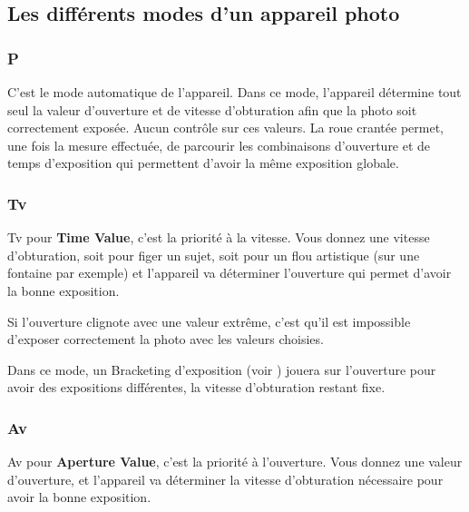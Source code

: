 \documentclass[a4paper,twoside]{article}
\begin{document}

\subsection{Les différents modes d'un appareil photo}
\subsubsection{P}
C'est le mode automatique de l'appareil. Dans ce mode, l'appareil détermine tout seul la valeur d'ouverture et de vitesse d'obturation afin que la photo soit correctement exposée. Aucun contrôle sur ces valeurs. La roue crantée permet, une fois la mesure effectuée, de parcourir les combinaisons d'ouverture et de temps d'exposition qui permettent d'avoir la même exposition globale. 

\subsubsection{Tv}
Tv pour \textbf{Time Value}, c'est la priorité à la vitesse. Vous donnez une vitesse d'obturation, soit pour figer un sujet, soit pour un flou artistique (sur une fontaine par exemple) et l'appareil va déterminer l'ouverture qui permet d'avoir la bonne exposition.

Si l'ouverture clignote avec une valeur extrême, c'est qu'il est impossible d'exposer correctement la photo avec les valeurs choisies.

Dans ce mode, un Bracketing d'exposition (voir ) jouera sur l'ouverture pour avoir des expositions différentes, la vitesse d'obturation restant fixe.

\subsubsection{Av}
Av pour \textbf{Aperture Value}, c'est la priorité à l'ouverture. Vous donnez une valeur d'ouverture, et l'appareil va déterminer la vitesse d'obturation nécessaire pour avoir la bonne exposition. 
\end{document}
